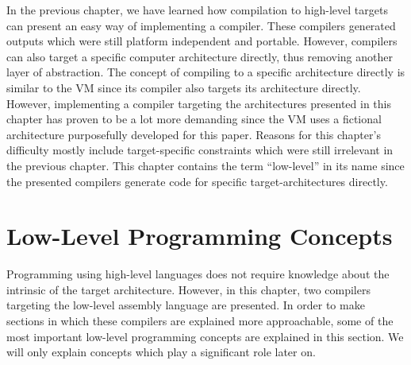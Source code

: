 In the previous chapter, we have learned how compilation to high-level targets can present an easy way of implementing a compiler.
These compilers generated outputs which were still platform independent and portable.
However, compilers can also target a specific computer architecture directly, thus removing another layer of abstraction.
The concept of compiling to a specific architecture directly is similar to the VM since its compiler also targets its architecture directly.
However, implementing a compiler targeting the architectures presented in this chapter has proven to be a lot more demanding since the VM uses a fictional architecture purposefully developed for this paper.
Reasons for this chapter's difficulty mostly include target-specific constraints which were
still irrelevant in the previous chapter.
This chapter contains the term \enquote{low-level} in its name since the presented compilers
generate code for specific target-architectures directly.

\section{Low-Level Programming Concepts}
Programming using high-level languages does not require knowledge about the intrinsic of the target architecture.
However, in this chapter, two compilers targeting the low-level assembly language are presented.
In order to make sections in which these compilers are explained more approachable,
some of the most important low-level programming concepts are explained in this section.
We will only explain concepts which play a significant role later on.


